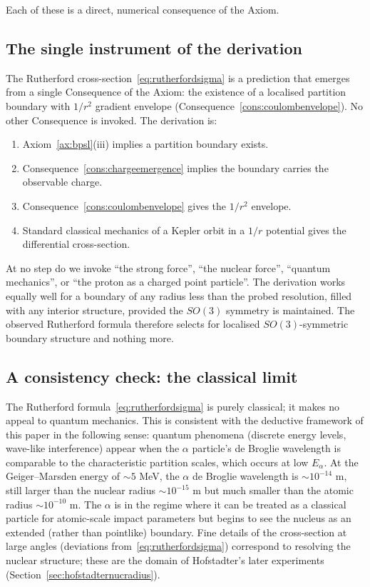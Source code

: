 \documentclass[11pt,twocolumn,a4paper]{article}
\theoremstyle{axiomstyle}
\theoremstyle{conseqstyle}
\theoremstyle{definition}
\theoremstyle{remark}
\begin{document}
Each of these is a direct, numerical consequence of the Axiom.

\subsection{The single instrument of the derivation}

The Rutherford cross-section~\eqref{eq:rutherfordsigma} is a prediction that emerges from a single Consequence of the Axiom: the existence of a localised partition boundary with $1/r^{2}$ gradient envelope (Consequence~\ref{cons:coulombenvelope}). No other Consequence is invoked. The derivation is:
\begin{enumerate}
\item Axiom~\ref{ax:bpsl}(iii) implies a partition boundary exists.
\item Consequence~\ref{cons:chargeemergence} implies the boundary carries the observable charge.
\item Consequence~\ref{cons:coulombenvelope} gives the $1/r^{2}$ envelope.
\item Standard classical mechanics of a Kepler orbit in a $1/r$ potential gives the differential cross-section.
\end{enumerate}

At no step do we invoke ``the strong force'', ``the nuclear force'', ``quantum mechanics'', or ``the proton as a charged point particle''. The derivation works equally well for a boundary of any radius less than the probed resolution, filled with any interior structure, provided the $SO(3)$ symmetry is maintained. The observed Rutherford formula therefore selects for localised $SO(3)$-symmetric boundary structure and nothing more.

\subsection{A consistency check: the classical limit}

The Rutherford formula~\eqref{eq:rutherfordsigma} is purely classical; it makes no appeal to quantum mechanics. This is consistent with the deductive framework of this paper in the following sense: quantum phenomena (discrete energy levels, wave-like interference) appear when the $\alpha$ particle's de Broglie wavelength is comparable to the characteristic partition scales, which occurs at low $E_{\alpha}$. At the Geiger--Marsden energy of $\sim 5$ MeV, the $\alpha$ de Broglie wavelength is $\sim 10^{-14}$ m, still larger than the nuclear radius $\sim 10^{-15}$ m but much smaller than the atomic radius $\sim 10^{-10}$ m. The $\alpha$ is in the regime where it can be treated as a classical particle for atomic-scale impact parameters but begins to see the nucleus as an extended (rather than pointlike) boundary. Fine details of the cross-section at large angles (deviations from~\eqref{eq:rutherfordsigma}) correspond to resolving the nuclear structure; these are the domain of Hofstadter's later experiments (Section~\ref{sec:hofstadternucradius}).
\end{document}
